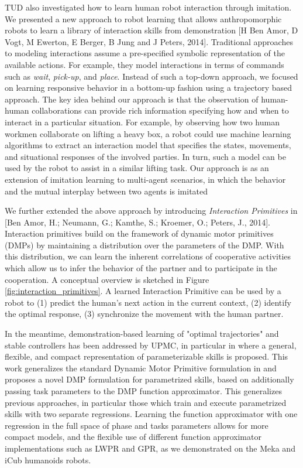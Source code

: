 TUD also investigated how to learn human robot interaction through imitation. We presented a new approach to robot learning that allows anthropomorphic robots to learn a library of interaction skills from demonstration [H Ben Amor, D Vogt, M Ewerton, E Berger, B Jung and J Peters, 2014]. Traditional approaches to modeling interactions assume a pre-specified symbolic representation of the available actions. For example, they model interactions
in terms of commands such as \emph{wait}, \emph{pick-up}, and \emph{place}. Instead of such a top-down approach, we focused on learning responsive behavior in a bottom-up fashion using a trajectory based approach. The key idea behind our approach is that the observation of human-human collaborations can provide rich information specifying how and when to interact
in a particular situation. For example, by observing how two human workmen collaborate on lifting a heavy box, a robot could use machine learning algorithms to extract an
interaction model that specifies the states, movements, and situational responses of the involved parties. In turn, such a model can be used by the robot to assist in a similar lifting task. Our approach is as an extension of imitation learning to multi-agent scenarios, in which the behavior and the mutual interplay between two agents is imitated


We further extended the above approach by introducing \emph{Interaction Primitives} in [Ben Amor, H.; Neumann, G.; Kamthe, S.; Kroemer, O.; Peters, J., 2014]. Interaction primitives build on the framework of dynamic motor primitives (DMPs) by maintaining a distribution over the parameters of the DMP. With this distribution, we can learn the inherent correlations of cooperative activities which allow us to infer the behavior of the partner and to participate in the cooperation. A conceptual overview is sketched in Figure \ref{fig:interaction_primitives}. A learned Interaction Primitive can be used by a robot to (1) predict the human's next action in the current context, (2) identify the optimal response, (3) synchronize the movement with the human partner.

In the meantime, demonstration-based learning of "optimal trajectories" and stable controllers has been addressed by UPMC, in particular in \cite{stulp2013} where a general, flexible, and compact representation of parameterizable skills is proposed. This work generalizes the standard Dynamic Motor Primitive formulation in \cite{ijspeert2013} and proposes a novel DMP formulation for parametrized skills, based on additionally passing task parameters to the DMP function approximator. This generalizes previous approaches, in particular those which train and execute parametrized skills with two separate regressions. Learning the function approximator with one regression in the full space of phase and tasks parameters allows for more compact models, and the flexible use of different function approximator implementations such as LWPR and GPR, as we demonstrated on the Meka and iCub humanoids robots.
